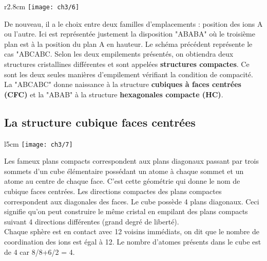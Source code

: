 			\begin{wrapfigure}[4]{r}{2.8cm}
			\vspace{-8mm}
			\texttt{[image: ch3/6]}
			\end{wrapfigure}
			De nouveau, il a le choix entre deux familles d'emplacements : position des ions A ou l'autre. Ici est représentée justement la disposition "ABABA" où le troisième plan est à la position du plan A en hauteur. Le schéma précédent représente le cas "ABCABC. Selon les deux empilements présentés, on obtiendra deux structures cristallines différentes et sont appelées \textbf{structures compactes}. Ce sont les deux seules manières d'empilement vérifiant la condition de compacité.
			La "ABCABC" donne naissance à la structure \textbf{cubiques à faces centrées (CFC)} et la "ABAB" à la structure \textbf{hexagonales compacte (HC)}.
			
		\subsection{La structure cubique faces centrées}
			\begin{wrapfigure}[5]{l}{5cm}
			\vspace{-5mm}
			\texttt{[image: ch3/7]}
			\end{wrapfigure}
			Les fameux plans compacts correspondent aux plans diagonaux passant par trois sommets d'un cube élémentaire possédant un atome à chaque sommet et un atome au centre de chaque face. C'est cette géométrie qui donne le nom de cubique faces centrées. Les directions compactes des plans compactes correspondent aux diagonales des faces. Le cube possède 4 plans diagonaux. Ceci signifie qu'on peut construire le même cristal en empilant des plans compacts suivant 4 directions différentes (grand degré de liberté). \\
			Chaque sphère est en contact avec 12 voisins immédiats, on dit que le nombre de coordination des ions est égal à 12. Le nombre d'atomes présents dans le cube est de 4 car 8/8+6/2 = 4.\\
			
